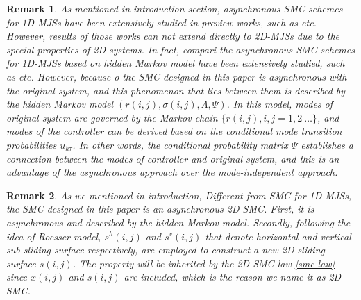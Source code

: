 \documentclass[journal,final,twocolumn]{IEEEtran}
\newtheorem{remark}{Remark}
\begin{document}
		
	\begin{remark}
		As mentioned in introduction section,  asynchronous SMC schemes for 1D-MJSs have been extensively studied in preview works, such as \cite{song2018asynchronous,li2017passivity,qi2018observer} etc. However, results of those works can not  extend directly to 2D-MJSs due to the special properties of 2D systems. In fact, compari
		the asynchronous SMC schemes for 1D-MJSs based on hidden Markov model have been extensively studied, such as \cite{song2018asynchronous,li2017passivity,qi2018observer} etc. However, because o 
		 the SMC  designed in this paper is  asynchronous with the original system, and this phenomenon that lies between them is described by the hidden Markov model $(r(i,j),\sigma(i,j),\varLambda,\varPsi)$. %
		In this model, modes of original system are governed by the Markov chain $\{r(i,j), i,j=1,2\ \dots\}$, and modes of the controller can be derived based on the conditional mode transition probabilities $u_{k\tau}$. In other words, the conditional probability matrix $\varPsi$ establishes a connection between the modes of controller and original system, and this is an advantage of the asynchronous approach over the mode-independent approach.
	\end{remark}

\begin{remark}
	As we mentioned in introduction, 
	Different from SMC for 1D-MJSs\cite{song2018asynchronous,li2017passivity,qi2018observer}, the SMC designed in this paper is an asynchronous 2D-SMC. First, it is asynchronous and described by the hidden Markov model. Secondly, following the idea of Roesser model, $s^{h}(i,j)$ and $s^{v}(i,j)$ that denote horizontal and vertical sub-sliding surface respectively, are employed to construct a new 2D sliding surface $s(i,j)$. The property will be inherited by the 2D-SMC law \eqref{smc-law} since $x(i,j)$ and $s(i,j)$ are included, which is the reason we name it as 2D-SMC.
\end{remark}


	
\end{document}
